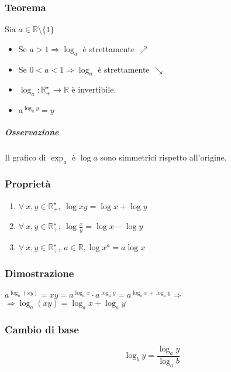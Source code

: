     \subsubsection*{Teorema}
        Sia $a \in \mathbb{R} \setminus \{1\}$
        \begin{itemize}
            \item Se $a > 1 \Rightarrow \log_{a}$ è strettamente $\nearrow$
            \item Se $0 < a < 1 \Rightarrow \log_{a}$ è strettamente $\searrow$
            \item $\log_{a}: \mathbb{R}^{\star}_{+} \rightarrow \mathbb{R}$ è invertibile.
            \item $a^{\log_{a}{y}} = y$ 
        \end{itemize}
    \subparagraph*{Osservazione}
        Il grafico di $\exp_{a}$ è $\log{a}$ sono simmetrici rispetto all'origine.
    \subsubsection*{Proprietà}
        \begin{large}
        \begin{enumerate}
            \item $\forall\ x, y \in \mathbb{R}^{\star}_{+},\ \log{xy} = \log{x} + \log{y}$
            \item $\forall\ x, y \in \mathbb{R}^{\star}_{+},\ \log{\frac{x}{y}} = \log{x} - \log{y}$
            \item $\forall\ x, y \in \mathbb{R}^{\star}_{+},\ a \in \mathbb{R}, \log{x^{a}} = a \log{x}$
        \end{enumerate}
        \end{large}
    \subsubsection*{Dimostrazione}
        \begin{Large}
        $a^{\log_{a}{(xy)}} = xy = a^{\log_{a}{x}} \cdot a^{\log_{a}{y}}=a^{\log_{a}{x} + \log_{a}{y}} \Rightarrow$\\
        $\Rightarrow \log_{a}{(xy)} = \log_{a}{x} + \log_{a}{y}$
        \end{Large}
        \subsubsection*{Cambio di base}
        \begin{Large}
        \[
            \log_{b}{y} = \frac{\log_{a}{y}}{\log_{a}{b}}    
        \]
        \end{Large}